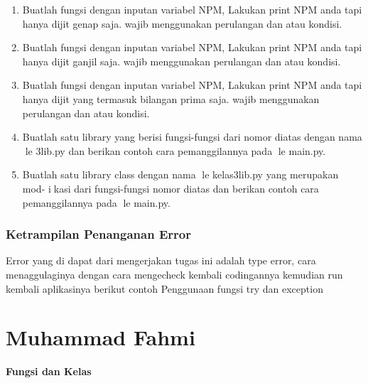 \begin{enumerate}
    \item Buatlah fungsi dengan inputan variabel NPM, Lakukan print NPM anda tapi
    hanya dijit genap saja. wajib menggunakan perulangan dan atau kondisi.
    

    \item Buatlah fungsi dengan inputan variabel NPM, Lakukan print NPM anda tapi
    hanya dijit ganjil saja. wajib menggunakan perulangan dan atau kondisi.
    

    \item Buatlah fungsi dengan inputan variabel NPM, Lakukan print NPM anda tapi
    hanya dijit yang termasuk bilangan prima saja. wajib menggunakan perulangan
    dan atau kondisi.
    

    \item Buatlah satu library yang berisi fungsi-fungsi dari nomor diatas dengan nama
    le 3lib.py dan berikan contoh cara pemanggilannya pada le main.py.
    

    \item Buatlah satu library class dengan nama le kelas3lib.py yang merupakan mod-
    ikasi dari fungsi-fungsi nomor diatas dan berikan contoh cara pemanggilannya
    pada le main.py.
    
    
\end{enumerate}
\subsubsection{Ketrampilan Penanganan Error}
Error yang di dapat dari mengerjakan tugas ini adalah type error, cara menaggulaginya dengan cara mengecheck kembali codingannya
kemudian run kembali aplikasinya
berikut contoh Penggunaan fungsi try dan exception




\section{Muhammad Fahmi}
\textbf{{\large Fungsi dan Kelas}}

